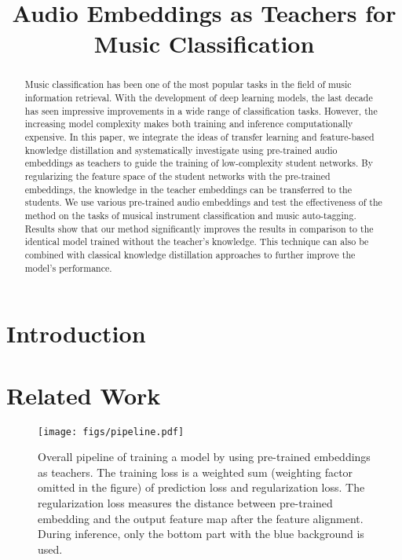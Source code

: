 \documentclass{article}
\title{Audio Embeddings as Teachers for Music Classification}
\begin{document}
\maketitle
\begin{abstract}
Music classification has been one of the most popular tasks in the field of music information retrieval.
With the development of deep learning models, the last decade has seen impressive improvements in a wide range of classification tasks.
However, the increasing model complexity makes both training and inference computationally expensive.
In this paper, we integrate the ideas of transfer learning and feature-based knowledge distillation and systematically investigate using pre-trained audio embeddings as teachers to guide the training of low-complexity student networks.
By regularizing the feature space of the student networks with the pre-trained embeddings, the knowledge in the teacher embeddings can be transferred to the students.
We use various pre-trained audio embeddings and test the effectiveness of the method on the tasks of musical instrument classification and music auto-tagging.
Results show that our method significantly improves the results in comparison to the identical model trained without the teacher's knowledge.
This technique can also be combined with classical knowledge distillation approaches to further improve the model's performance.


\end{abstract}


\section{Introduction}\label{sec:introduction}


\section{Related Work}\label{sec:related_works}



    \begin{figure*}[htbp]
     \centering
     \texttt{[image: figs/pipeline.pdf]}
     \caption{Overall pipeline of training a model by using pre-trained embeddings as teachers. The training loss is a weighted sum (weighting factor omitted in the figure) of prediction loss and regularization loss. The regularization loss measures the distance between pre-trained embedding and the output feature map after the feature alignment. During inference, only the bottom part with the blue background is used.}\label{fig:pipeline}
    \end{figure*}
    
\end{document}
